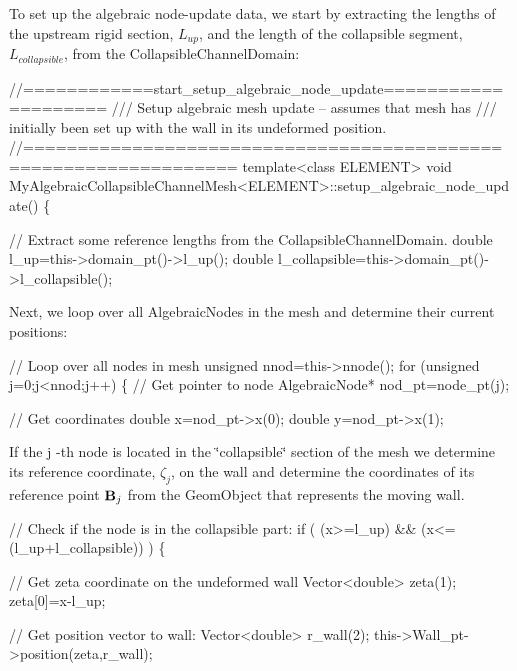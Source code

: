 To set up the algebraic node-\/update data, we start by extracting the lengths of the upstream rigid section, $ L_{up} $, and the length of the collapsible segment, $ L_{collapsible} $, from the {\ttfamily Collapsible\+Channel\+Domain\+:} 


\begin{DoxyCodeInclude}
\textcolor{comment}{//============start\_setup\_algebraic\_node\_update====================}
\textcolor{comment}{/// Setup algebraic mesh update -- assumes that mesh has}
\textcolor{comment}{}\textcolor{comment}{/// initially been set up with the wall in its undeformed position.}
\textcolor{comment}{}\textcolor{comment}{//=================================================================}
\textcolor{keyword}{template}<\textcolor{keyword}{class} ELEMENT>
\textcolor{keywordtype}{void} MyAlgebraicCollapsibleChannelMesh<ELEMENT>::setup\_algebraic\_node\_update()
\{

 \textcolor{comment}{// Extract some reference lengths from the CollapsibleChannelDomain. }
 \textcolor{keywordtype}{double} l\_up=this->domain\_pt()->l\_up();
 \textcolor{keywordtype}{double} l\_collapsible=this->domain\_pt()->l\_collapsible();

\end{DoxyCodeInclude}


Next, we loop over all {\ttfamily Algebraic\+Nodes} in the mesh and determine their current positions\+:


\begin{DoxyCodeInclude}
 \textcolor{comment}{// Loop over all nodes in mesh}
 \textcolor{keywordtype}{unsigned} nnod=this->nnode();
 \textcolor{keywordflow}{for} (\textcolor{keywordtype}{unsigned} j=0;j<nnod;j++)
  \{
   \textcolor{comment}{// Get pointer to node}
   AlgebraicNode* nod\_pt=node\_pt(j);

   \textcolor{comment}{// Get coordinates}
   \textcolor{keywordtype}{double} x=nod\_pt->x(0);
   \textcolor{keywordtype}{double} y=nod\_pt->x(1);

\end{DoxyCodeInclude}


If the {\ttfamily j} -\/th node is located in the \char`\"{}collapsible\char`\"{} section of the mesh we determine its reference coordinate, $ \zeta_j $, on the wall and determine the coordinates of its reference point $ {\bf B}_j $ from the {\ttfamily Geom\+Object} that represents the moving wall.


\begin{DoxyCodeInclude}
   \textcolor{comment}{// Check if the node is in the collapsible part:}
   \textcolor{keywordflow}{if} ( (x>=l\_up) && (x<=(l\_up+l\_collapsible)) )
    \{

     \textcolor{comment}{// Get zeta coordinate on the undeformed wall}
     Vector<double> zeta(1);
     zeta[0]=x-l\_up;

     \textcolor{comment}{// Get position vector to wall:}
     Vector<double> r\_wall(2);
     this->Wall\_pt->position(zeta,r\_wall);

\end{DoxyCodeInclude}


